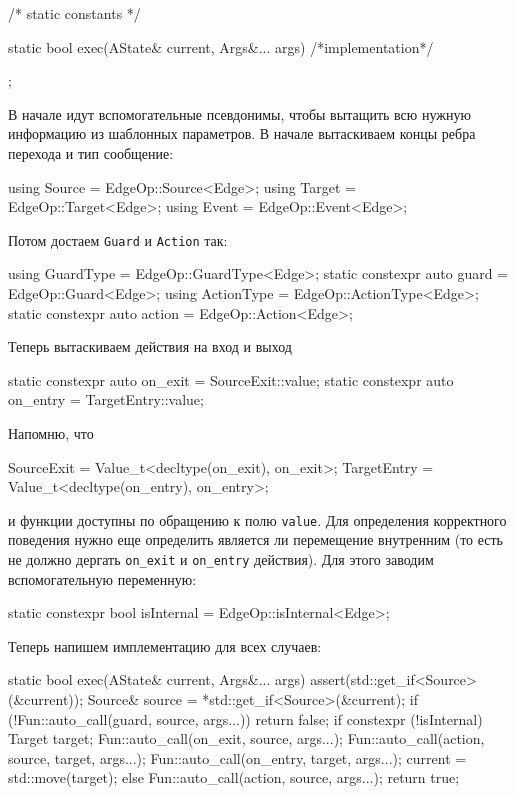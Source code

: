 \documentclass{article}
\begin{document}
{\begin{cppcode}[\nonumbers]
{  /* static constants */
  
  static bool exec(AState& current, Args&... args) {
    /*implementation*/
  }
};
\end{cppcode}
В начале идут вспомогательные псевдонимы, чтобы вытащить всю нужную информацию из шаблонных параметров.
В начале вытаскиваем концы ребра перехода и тип сообщение:
\begin{cppcode}[\nonumbers]
using Source = EdgeOp::Source<Edge>;
using Target = EdgeOp::Target<Edge>;
using Event = EdgeOp::Event<Edge>;
\end{cppcode}
Потом достаем \verb"Guard" и \verb"Action" так:
\begin{cppcode}[\nonumbers]
using GuardType = EdgeOp::GuardType<Edge>;
static constexpr auto guard = EdgeOp::Guard<Edge>;
using ActionType = EdgeOp::ActionType<Edge>;
static constexpr auto action = EdgeOp::Action<Edge>;
\end{cppcode}
Теперь вытаскиваем действия на вход и выход
\begin{cppcode}[\nonumbers]
static constexpr auto on_exit = SourceExit::value;
static constexpr auto on_entry = TargetEntry::value;
\end{cppcode}
Напомню, что 
\begin{cppcode}[\nonumbers]
SourceExit  = Value_t<decltype(on_exit), on_exit>;
TargetEntry = Value_t<decltype(on_entry), on_entry>;
\end{cppcode}
и функции доступны по обращению к полю \verb"value".
Для определения корректного поведения нужно еще определить является ли перемещение внутренним (то есть не должно дергать \verb"on_exit" и \verb"on_entry" действия).
Для этого заводим вспомогательную переменную:
\begin{cppcode}[\nonumbers]
static constexpr bool isInternal = EdgeOp::isInternal<Edge>;
\end{cppcode}
Теперь напишем имплементацию для всех случаев:
\begin{cppcode}[\nonumbers]
static bool exec(AState& current, Args&... args) {
  assert(std::get_if<Source>(&current));
  Source& source = *std::get_if<Source>(&current);
  if (!Fun::auto_call(guard, source, args...))
    return false;
  if constexpr (!isInternal) {
    Target target;
    Fun::auto_call(on_exit, source, args...);
    Fun::auto_call(action, source, target, args...);
    Fun::auto_call(on_entry, target, args...);
    current = std::move(target);
  } else {
    Fun::auto_call(action, source, args...);
  }
  return true;
}
\end{cppcode}
}
\end{document}

